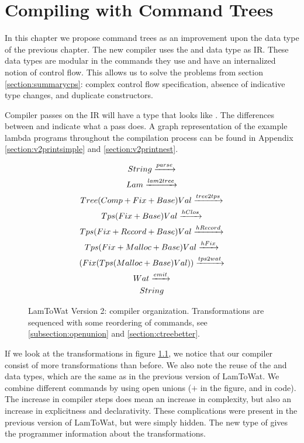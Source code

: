 
\chapter{\label{chap:treecomp}Compiling with Command Trees}
In this chapter we propose command trees as an improvement upon the  data type of the previous chapter. The new compiler uses the  and  data type as IR. These data types are modular in the commands they use and have an internalized notion of control flow. This allows us to solve the problems from section \ref{section:summarycps}: complex control flow specification, absence of indicative type changes, and duplicate constructors.

Compiler passes on the IR will have a type that looks like . The differences between  and  indicate what a pass does. A graph representation of the example lambda programs throughout the compilation process can be found in Appendix \ref{section:v2printsimple} and \ref{section:v2printnest}.

\begin{figure}
\begin{gather*}
  String \xrightarrow{parse}\\
  Lam \xrightarrow{lam2tree}\\
  Tree  (Comp + Fix + Base) Val \xrightarrow{tree2tps}\\
  Tps          (Fix + Base) Val \xrightarrow{hClos}\\
  Tps (Fix + Record + Base) Val \xrightarrow{hRecord}\\
  Tps (Fix + Malloc + Base) Val \xrightarrow{hFix}\\
  (Fix (Tps (Malloc + Base) Val)) \xrightarrow{tps2wat}\\
  Wat \xrightarrow{emit}\\
  String
\end{gather*}
\caption{LamToWat Version 2: compiler organization. Transformations are sequenced with some reordering of commands, see \ref{subsection:openunion} and \ref{section:ctreebetter}.}
\label{fig:lam2watv2org}
\end{figure}

If we look at the transformations in figure \ref{fig:lam2watv2org}, we notice that our compiler consist of more transformations than before. We also note the reuse of the  and  data types, which are the same as in the previous version of LamToWat. We combine different commands by using open unions ($+$ in the figure, and \icode{:+:} in code). The increase in compiler steps does mean an increase in complexity, but also an increase in explicitness and declarativity. These complications were present in the previous version of LamToWat, but were simply hidden. The new type of  gives the programmer information about the transformations. 


